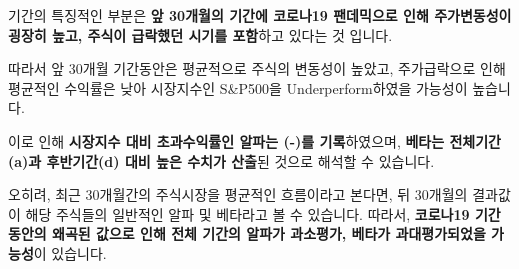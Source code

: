 \documentclass[
  a4paper,
  DIV=11,
  numbers=noendperiod]{scrreprt}
\begin{document}
기간의 특징적인 부분은 \textbf{앞 30개월의 기간에 코로나19 팬데믹으로
인해 주가변동성이 굉장히 높고, 주식이 급락했던 시기를 포함}하고 있다는
것 입니다.

따라서 앞 30개월 기간동안은 평균적으로 주식의 변동성이 높았고,
주가급락으로 인해 평균적인 수익률은 낮아 시장지수인 S\&P500을
Underperform하였을 가능성이 높습니다.

이로 인해 \textbf{시장지수 대비 초과수익률인 알파는 (-)를 기록}하였으며,
\textbf{베타는 전체기간(a)과 후반기간(d) 대비 높은 수치가 산출}된 것으로
해석할 수 있습니다.

오히려, 최근 30개월간의 주식시장을 평균적인 흐름이라고 본다면, 뒤
30개월의 결과값이 해당 주식들의 일반적인 알파 및 베타라고 볼 수
있습니다. 따라서, \textbf{코로나19 기간동안의 왜곡된 값으로 인해 전체
기간의 알파가 과소평가, 베타가 과대평가되었을 가능성}이 있습니다.
\end{document}
